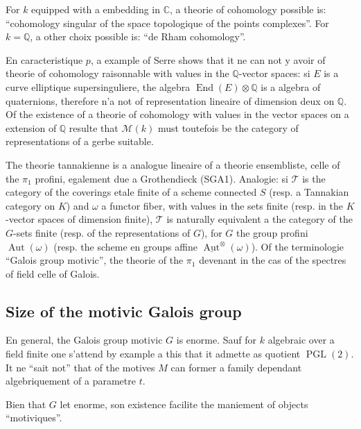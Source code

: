 \documentclass[11pt,a4paper]{article}
\theoremstyle{plain}
\theoremstyle{definition}
\DeclareMathOperator{\Aut}{Aut}
\DeclareMathOperator{\End}{End}
\DeclareMathOperator{\PGL}{PGL}
\newcommand{\Q}{\mathbb{Q}}
\newcommand{\C}{\mathbb{C}}
\begin{document}
For $k$ equipped with a embedding in $\C$, a theorie of cohomology possible is: ``cohomology singular of the space topologique of the points complexes''. For $k = \Q$, a other choix possible is: ``de Rham cohomology''.

En caracteristique $p$, a example of Serre shows that it ne can not y avoir of theorie of cohomology raisonnable with values in the $\Q$-vector spaces: si $E$ is a curve elliptique supersinguliere, the algebra $\End(E) \otimes \Q$ is a algebra of quaternions, therefore n'a not of representation lineaire of dimension deux on $\Q$. Of the existence of a theorie of cohomology with values in the vector spaces on a extension of $\Q$ resulte that $\mathcal{M}(k)$ must toutefois be the category of representations of a gerbe suitable.

The theorie tannakienne is a analogue lineaire of a theorie ensembliste, celle of the $\pi_1$ profini, egalement due a Grothendieck (SGA1). Analogie: si $\mathcal{T}$ is the category of the coverings etale finite of a scheme connected $S$ (resp. a Tannakian category on $K$) and $\omega$ a functor fiber, with values in the sets finite (resp. in the $K$-vector spaces of dimension finite), $\mathcal{T}$ is naturally equivalent a the category of the $G$-sets finite (resp. of the representations of $G$), for $G$ the group profini $\Aut(\omega)$ (resp. the scheme en groups affine $\underline{\Aut}^{\otimes}(\omega)$). Of the terminologie ``Galois group motivic'', the theorie of the $\pi_1$ devenant in the cas of the spectres of field celle of Galois.

\subsection{Size of the motivic Galois group}

En general, the Galois group motivic $G$ is enorme. Sauf for $k$ algebraic over a field finite one s'attend by example a this that it admette as quotient $\PGL(2)$. It ne ``sait not'' that of the motives $M$ can former a family dependant algebriquement of a parametre $t$.

Bien that $G$ let enorme, son existence facilite the maniement of objects ``motiviques''.
\end{document}
